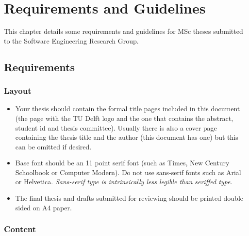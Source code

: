 \chapter{Requirements and Guidelines}

This chapter details some requirements and guidelines for MSc theses
submitted to the Software Engineering Research Group.

\section{Requirements}

\subsection{Layout}

\begin{itemize}
\item Your thesis should contain the formal title pages included in
  this document (the page with the TU Delft logo and the one that
  contains the abstract, student id and thesis committee). Usually
  there is also a cover page containing the thesis title and the
  author (this document has one) but this can be omitted if desired.
 
\item Base font should be an 11 point serif font (such as Times, New
  Century Schoolbook or Computer Modern). Do not use sans-serif fonts
  such as Arial or Helvetica. \textsl{Sans-serif type is intrinsically
  less legible than seriffed type}.

\item The final thesis and drafts submitted for reviewing should be
printed double-sided on A4 paper.
\end{itemize}

\subsection{Content}

